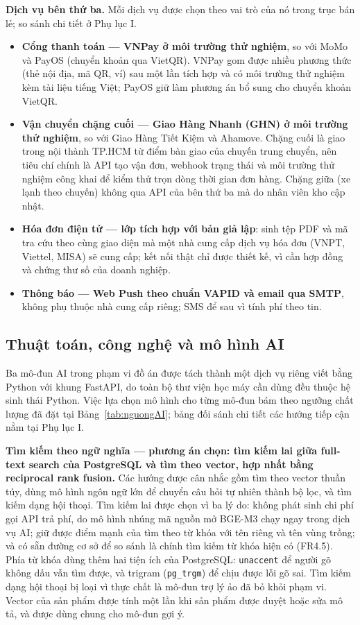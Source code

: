 \noindent\textbf{Dịch vụ bên thứ ba.} Mỗi dịch vụ được chọn theo vai trò của nó trong trục bán lẻ; so sánh chi tiết ở Phụ lục I.
\begin{itemize}
    \item \textbf{Cổng thanh toán --- VNPay ở môi trường thử nghiệm}, so với MoMo và PayOS (chuyển khoản qua VietQR). VNPay gom được nhiều phương thức (thẻ nội địa, mã QR, ví) sau một lần tích hợp và có môi trường thử nghiệm kèm tài liệu tiếng Việt; PayOS giữ làm phương án bổ sung cho chuyển khoản VietQR.
    \item \textbf{Vận chuyển chặng cuối --- Giao Hàng Nhanh (GHN) ở môi trường thử nghiệm}, so với Giao Hàng Tiết Kiệm và Ahamove. Chặng cuối là giao trong nội thành TP.HCM từ điểm bàn giao của chuyến trung chuyển, nên tiêu chí chính là API tạo vận đơn, webhook trạng thái và môi trường thử nghiệm công khai để kiểm thử trọn dòng thời gian đơn hàng. Chặng giữa (xe lạnh theo chuyến) không qua API của bên thứ ba mà do nhân viên kho cập nhật.
    \item \textbf{Hóa đơn điện tử --- lớp tích hợp với bản giả lập}: sinh tệp PDF và mã tra cứu theo cùng giao diện mà một nhà cung cấp dịch vụ hóa đơn (VNPT, Viettel, MISA) sẽ cung cấp; kết nối thật chỉ được thiết kế, vì cần hợp đồng và chứng thư số của doanh nghiệp.
    \item \textbf{Thông báo --- Web Push theo chuẩn VAPID và email qua SMTP}, không phụ thuộc nhà cung cấp riêng; SMS để sau vì tính phí theo tin.
\end{itemize}

\subsection{Thuật toán, công nghệ và mô hình AI}

Ba mô-đun AI trong phạm vi đồ án được tách thành một dịch vụ riêng viết bằng Python với khung FastAPI, do toàn bộ thư viện học máy cần dùng đều thuộc hệ sinh thái Python. Việc lựa chọn mô hình cho từng mô-đun bám theo ngưỡng chất lượng đã đặt tại Bảng~\ref{tab:nguongAI}; bảng đối sánh chi tiết các hướng tiếp cận nằm tại Phụ lục I.

\noindent\textbf{Tìm kiếm theo ngữ nghĩa --- phương án chọn: tìm kiếm lai giữa full-text search của PostgreSQL và tìm theo vector, hợp nhất bằng reciprocal rank fusion.} Các hướng được cân nhắc gồm tìm theo vector thuần túy, dùng mô hình ngôn ngữ lớn để chuyển câu hỏi tự nhiên thành bộ lọc, và tìm kiếm dạng hội thoại. Tìm kiếm lai được chọn vì ba lý do: không phát sinh chi phí gọi API trả phí, do mô hình nhúng mã nguồn mở BGE-M3 \parencite{chen2024bgem3} chạy ngay trong dịch vụ AI; giữ được điểm mạnh của tìm theo từ khóa với tên riêng và tên vùng trồng; và có sẵn đường cơ sở để so sánh là chính tìm kiếm từ khóa hiện có (FR4.5). Phía từ khóa dùng thêm hai tiện ích của PostgreSQL: \texttt{unaccent} để người gõ không dấu vẫn tìm được, và trigram (\texttt{pg\_trgm}) để chịu được lỗi gõ sai. Tìm kiếm dạng hội thoại bị loại vì thực chất là mô-đun trợ lý ảo đã bỏ khỏi phạm vi. Vector của sản phẩm được tính một lần khi sản phẩm được duyệt hoặc sửa mô tả, và được dùng chung cho mô-đun gợi ý.

